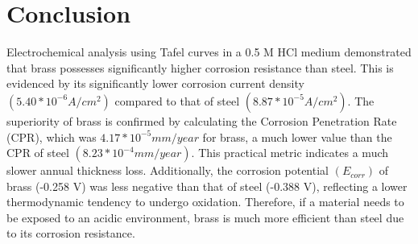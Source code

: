 \section{Conclusion}

Electrochemical analysis using Tafel curves in a 0.5 M HCl medium demonstrated that brass possesses significantly higher corrosion resistance than steel. This is evidenced by its significantly lower corrosion current density $(5.40 * 10^{-6} A/cm^2)$ compared to that of steel $(8.87 * 10^{-5} A/cm^2)$. The superiority of brass is confirmed by calculating the Corrosion Penetration Rate (CPR), which was $4.17 * 10^{-5} mm/year$ for brass, a much lower value than the CPR of steel $(8.23 * 10^{-4} mm/year)$. This practical metric indicates a much slower annual thickness loss. Additionally, the corrosion potential $(E_{corr})$ of brass (-0.258 V) was less negative than that of steel (-0.388 V), reflecting a lower thermodynamic tendency to undergo oxidation. Therefore, if a material needs to be exposed to an acidic environment, brass is much more efficient than steel due to its corrosion resistance.

